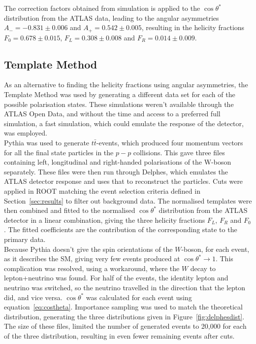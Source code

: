 \documentclass[12pt,a4paper]{article}
\numberwithin{equation}{section}
\begin{document}
The correction factors obtained from simulation is applied to the
$\cos\theta^{*}$ distribution from the ATLAS data, leading to the angular asymmetries
$A_- = -0.831 \pm 0.006$ and $A_+ = 0.542 \pm 0.005$, resulting in the helicity
fractions $F_0=0.678 \pm 0.015$, $F_L=0.308 \pm 0.008$ and $F_R=0.014 \pm 0.009$.

\subsection{Template Method}
As an alternative to finding the helicity fractions using angular asymmetries,
the Template Method was used by generating a different data set for each of the
possible polarisation states. These simulations weren't available through the
ATLAS Open Data, and without the time and access to a preferred full simulation,
a fast simulation, which could emulate the response of the detector,
was employed.\\

Pythia was used to generate $t\bar t$-events, which produced four momentum
vectors for all the final state particles in the $p-p$ collisions. This gave
three files containing left, longitudinal and right-handed polarisations of the
W-boson separately. These files were then run through Delphes, which emulates
the ATLAS detector response and uses that to reconstruct the particles. Cuts
were applied in ROOT matching the event selection criteria defined in
Section~\ref{sec:results} to filter out background data. The normalised
templates were then combined and fitted to the normalised $\cos \theta^{*}$
distribution from the ATLAS detector in a linear combination, giving the three
helicity fractions $F_L$, $F_R$ and $F_0$. The fitted coefficients are the
contribution of the corresponding state to the primary data.\\

Because Pythia doesn't give the spin orientations of the $W$-boson, for each
event, as it describes the SM, giving very few events produced at
$\cos \theta^{*} \rightarrow 1$. This complication was resolved, using a workaround, where the
$W$ decay to lepton+neutrino was found. For half of the events, the identity
lepton and neutrino was switched, so the neutrino travelled in the direction
that the lepton did, and vice versa. $\cos \theta^{*}$ was calculated for each event
using equation~\ref{eq:costheta}. Importance sampling was used to match the
theoretical distribution, generating the three distributions given in
Figure~\ref{fig:delphesdist}. The size of these files, limited the number of
generated events to 20,000 for each of the three distribution, resulting in even
fewer remaining events after cuts.
\end{document}
